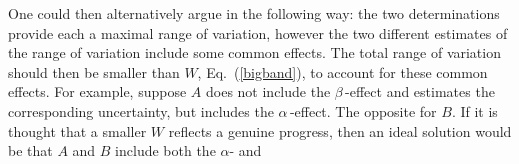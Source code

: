 %
%
One could then alternatively argue in the following way: the two determinations
provide each a maximal range of variation, however the two different
estimates of the range of variation include some common effects. The
total range of variation should then be smaller than $W$, Eq.~(\ref{bigband}), 
to account for these common effects. 
For example, suppose  $A$ does not include the $\beta\,$-effect and estimates 
the corresponding uncertainty, but includes the $\alpha\,$-effect. The 
opposite for $B$. 
If it is thought that a smaller $W$ reflects a genuine progress, then
an ideal solution would be that $A$ and $B$ include  both the $\alpha$- and 
